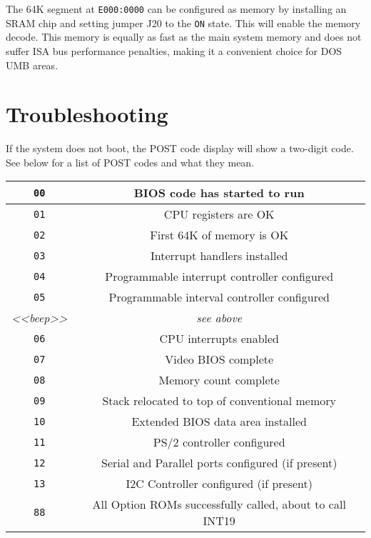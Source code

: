 \documentclass[twoside,10pt,letterpaper]{refart}
\begin{document}
The 64K segment at \texttt{E000:0000} can be configured as memory by installing an SRAM
chip and setting jumper J20 to the \texttt{ON} state. This will enable the memory decode.
This memory is equally as fast as the main system memory and does not suffer ISA bus
performance penalties, making it a convenient choice for DOS UMB areas.

\newpage

\section{Troubleshooting}
If the system does not boot, the POST code display will show a two-digit code.
See below for a list of POST codes and what they mean.

\begin{center}
\begin{tabular}{ c|c }
 \texttt{00} & BIOS code has started to run \\\hline
 \texttt{01} & CPU registers are OK \\\hline
 \texttt{02} & First 64K of memory is OK \\\hline
 \texttt{03} & Interrupt handlers installed \\\hline
 \texttt{04} & Programmable interrupt controller configured \\\hline
 \texttt{05} & Programmable interval controller configured \\\hline
 \emph{<<beep>>} & \emph{see above} \\\hline
 \texttt{06} & CPU interrupts enabled \\\hline
 \texttt{07} & Video BIOS complete \\\hline
 \texttt{08} & Memory count complete \\\hline
 \texttt{09} & Stack relocated to top of conventional memory \\\hline
 \texttt{10} & Extended BIOS data area installed \\\hline
 \texttt{11} & PS/2 controller configured \\\hline
 \texttt{12} & Serial and Parallel ports configured (if present) \\\hline
 \texttt{13} & I2C Controller configured (if present) \\\hline
 \texttt{88} & All Option ROMs successfully called, about to call INT19 \\
\end{tabular}
\end{center}
\end{document}
